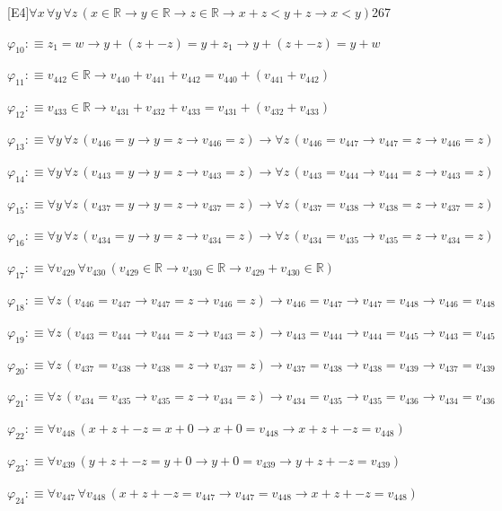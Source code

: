 \begin{fullproof}{[E4]}{$\forall x\,\forall y\,\forall z\,(x \in \mathbb{R} \to y \in \mathbb{R} \to z \in \mathbb{R} \to x + z < y + z \to x < y)$}{267}
\begin{abbrevlist}
\item $\varphi_{10} :\equiv z_{1} = w \to y + (z + -z) = y + z_{1} \to y + (z + -z) = y + w$
\item $\varphi_{11} :\equiv v_{442} \in \mathbb{R} \to v_{440} + v_{441} + v_{442} = v_{440} + (v_{441} + v_{442})$
\item $\varphi_{12} :\equiv v_{433} \in \mathbb{R} \to v_{431} + v_{432} + v_{433} = v_{431} + (v_{432} + v_{433})$
\item $\varphi_{13} :\equiv \forall y\,\forall z\,(v_{446} = y \to y = z \to v_{446} = z) \to \forall z\,(v_{446} = v_{447} \to v_{447} = z \to v_{446} = z)$
\item $\varphi_{14} :\equiv \forall y\,\forall z\,(v_{443} = y \to y = z \to v_{443} = z) \to \forall z\,(v_{443} = v_{444} \to v_{444} = z \to v_{443} = z)$
\item $\varphi_{15} :\equiv \forall y\,\forall z\,(v_{437} = y \to y = z \to v_{437} = z) \to \forall z\,(v_{437} = v_{438} \to v_{438} = z \to v_{437} = z)$
\item $\varphi_{16} :\equiv \forall y\,\forall z\,(v_{434} = y \to y = z \to v_{434} = z) \to \forall z\,(v_{434} = v_{435} \to v_{435} = z \to v_{434} = z)$
\item $\varphi_{17} :\equiv \forall v_{429}\,\forall v_{430}\,(v_{429} \in \mathbb{R} \to v_{430} \in \mathbb{R} \to v_{429} + v_{430} \in \mathbb{R})$
\item $\varphi_{18} :\equiv \forall z\,(v_{446} = v_{447} \to v_{447} = z \to v_{446} = z) \to v_{446} = v_{447} \to v_{447} = v_{448} \to v_{446} = v_{448}$
\item $\varphi_{19} :\equiv \forall z\,(v_{443} = v_{444} \to v_{444} = z \to v_{443} = z) \to v_{443} = v_{444} \to v_{444} = v_{445} \to v_{443} = v_{445}$
\item $\varphi_{20} :\equiv \forall z\,(v_{437} = v_{438} \to v_{438} = z \to v_{437} = z) \to v_{437} = v_{438} \to v_{438} = v_{439} \to v_{437} = v_{439}$
\item $\varphi_{21} :\equiv \forall z\,(v_{434} = v_{435} \to v_{435} = z \to v_{434} = z) \to v_{434} = v_{435} \to v_{435} = v_{436} \to v_{434} = v_{436}$
\item $\varphi_{22} :\equiv \forall v_{448}\,(x + z + -z = x + 0 \to x + 0 = v_{448} \to x + z + -z = v_{448})$
\item $\varphi_{23} :\equiv \forall v_{439}\,(y + z + -z = y + 0 \to y + 0 = v_{439} \to y + z + -z = v_{439})$
\item $\varphi_{24} :\equiv \forall v_{447}\,\forall v_{448}\,(x + z + -z = v_{447} \to v_{447} = v_{448} \to x + z + -z = v_{448})$

\end{abbrevlist}
\end{fullproof}
